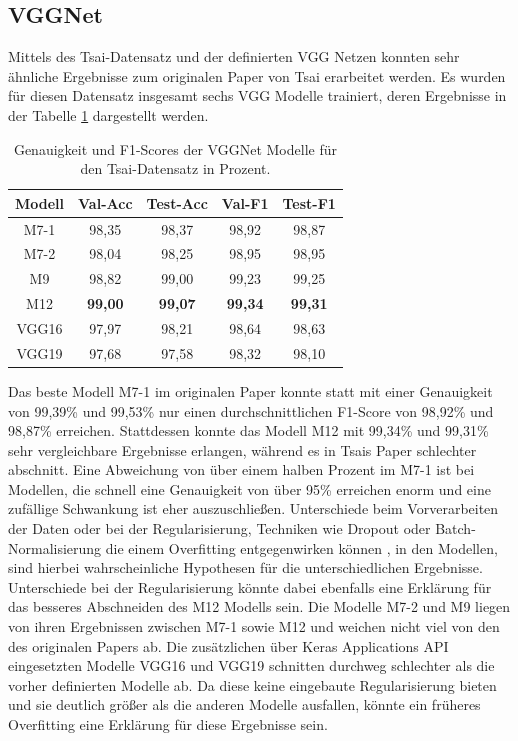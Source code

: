 \documentclass[twoside,a4paper]{IEEEtran}
\begin{document}
\subsection{VGGNet}

Mittels des Tsai-Datensatz und der definierten VGG Netzen konnten sehr ähnliche Ergebnisse zum originalen Paper von Tsai erarbeitet werden. Es wurden für diesen Datensatz insgesamt sechs VGG Modelle trainiert, deren Ergebnisse in der Tabelle \ref{vgg_ergebnis_tsai} dargestellt werden.
\begin{table}[!htb]
	\caption{Genauigkeit und F1-Scores der VGGNet Modelle für den Tsai-Datensatz in Prozent.}
	\label{vgg_ergebnis_tsai}
	\centering
	\begin{tabular}{|c|c|c|c|c|}
		\hline
		Modell & Val-Acc & Test-Acc & Val-F1 & Test-F1\\
		\hline
		\hline
		M7-1 & 98,35 & 98,37 & 98,92 & 98,87\\
		\hline
		M7-2 & 98,04 & 98,25 & 98,95 & 98,95\\
		\hline
		M9 & 98,82 & 99,00 & 99,23 & 99,25\\
		\hline 
		M12 & \textbf{99,00} & \textbf{99,07} & \textbf{99,34} & \textbf{99,31}\\
		\hline 
		VGG16 & 97,97 & 98,21 & 98,64 & 98,63\\
		\hline 
		VGG19 & 97,68 & 97,58 & 98,32 & 98,10\\
		\hline 
	\end{tabular}
\end{table}

Das beste Modell M7-1 im originalen Paper konnte statt mit einer Genauigkeit von 99,39\% und 99,53\% nur einen durchschnittlichen F1-Score von 98,92\% und 98,87\% erreichen. Stattdessen konnte das Modell M12 mit 99,34\% und 99,31\% sehr vergleichbare Ergebnisse erlangen, während es in Tsais Paper schlechter abschnitt. Eine Abweichung von über einem halben Prozent im M7-1 ist bei Modellen, die schnell eine Genauigkeit von über 95\% erreichen enorm und eine zufällige Schwankung ist eher auszuschließen. Unterschiede beim Vorverarbeiten der Daten oder bei der Regularisierung, Techniken wie Dropout oder Batch-Normalisierung die einem Overfitting entgegenwirken können \cite[S.27]{MACHINE_LEARNING}, in den Modellen, sind hierbei wahrscheinliche Hypothesen für die unterschiedlichen Ergebnisse. Unterschiede bei der Regularisierung könnte dabei ebenfalls eine Erklärung für das besseres Abschneiden des M12 Modells sein. Die Modelle M7-2 und M9 liegen von ihren Ergebnissen zwischen M7-1 sowie M12 und weichen nicht viel von den des originalen Papers ab. Die zusätzlichen über Keras Applications API eingesetzten Modelle VGG16 und VGG19 schnitten durchweg schlechter als die vorher definierten Modelle ab. Da diese keine eingebaute Regularisierung bieten \cite{keras_vgg} und sie deutlich größer als die anderen Modelle ausfallen, könnte ein früheres Overfitting eine Erklärung für diese Ergebnisse sein.
\end{document}
